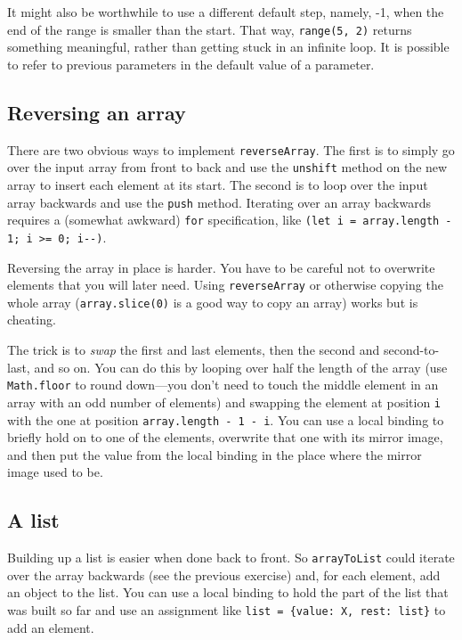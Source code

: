 It might also be worthwhile to use a different default step, namely, -1, when the end of the range is smaller than the start. That way, \lstinline`range(5, 2)` returns something meaningful, rather than getting stuck in an infinite loop. It is possible to refer to previous parameters in the default value of a parameter.

\subsection{Reversing an array}

There are two obvious ways to implement \lstinline`reverseArray`. The first is to simply go over the input array from front to back and use the \lstinline`unshift` method on the new array to insert each element at its start. The second is to loop over the input array backwards and use the \lstinline`push` method. Iterating over an array backwards requires a (somewhat awkward) \lstinline`for` specification, like \lstinline`(let i = array.length - 1; i >= 0; i--)`.

Reversing the array in place is harder. You have to be careful not to overwrite elements that you will later need. Using \lstinline`reverseArray` or otherwise copying the whole array (\lstinline`array.slice(0)` is a good way to copy an array) works but is cheating.

The trick is to \emph{swap} the first and last elements, then the second and second-to-last, and so on. You can do this by looping over half the length of the array (use \lstinline`Math.floor` to round down—you don't need to touch the middle element in an array with an odd number of elements) and swapping the element at position \lstinline`i` with the one at position \lstinline`array.length - 1 - i`. You can use a local binding to briefly hold on to one of the elements, overwrite that one with its mirror image, and then put the value from the local binding in the place where the mirror image used to be.

\subsection{A list}

Building up a list is easier when done back to front. So \lstinline`arrayToList` could iterate over the array backwards (see the previous exercise) and, for each element, add an object to the list. You can use a local binding to hold the part of the list that was built so far and use an assignment like \lstinline`list = {value: X, rest: list}` to add an element.

